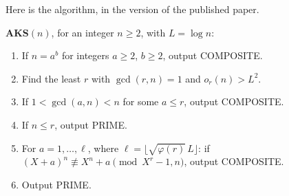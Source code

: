 Here is the algorithm, in the version of the published paper.

\begin{center}
\begin{minipage}{0.92\linewidth}
\textbf{AKS}$(n)$, for an integer $n\ge2$, with $L=\log n$:
\begin{enumerate}
\item If $n=a^b$ for integers $a\ge2$, $b\ge2$, output \textup{COMPOSITE}.
\item Find the least $r$ with $\gcd(r,n)=1$ and $o_r(n)>L^2$.
\item If $1<\gcd(a,n)<n$ for some $a\le r$, output \textup{COMPOSITE}.
\item If $n\le r$, output \textup{PRIME}.
\item For $a=1,\dots,\ell$, where $\ell=\lfloor\sqrt{\varphi(r)}\,L\rfloor$: if $(X+a)^n\not\equiv X^n+a\pmod{X^r-1,n}$, output \textup{COMPOSITE}.
\item Output \textup{PRIME}.
\end{enumerate}
\end{minipage}
\end{center}

